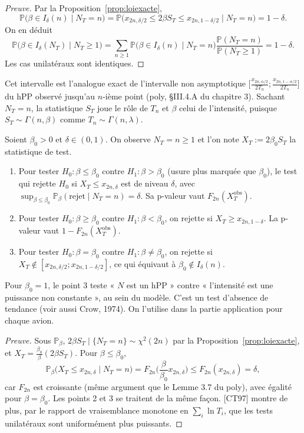 \begin{proof}[Preuve]
Par la Proposition~\ref{prop:loiexacte},
\[
\mathbb{P}\big(\beta\in I_\delta(n)\mid N_T=n\big)=\mathbb{P}\big(x_{2n,\delta/2}\le2\beta S_T\le x_{2n,1-\delta/2}\mid N_T=n\big)=1-\delta.
\]
On en déduit
\[
\mathbb{P}\big(\beta\in I_\delta(N_T)\mid N_T\ge1\big)=\sum_{n\ge1}\mathbb{P}\big(\beta\in I_\delta(n)\mid N_T=n\big)\frac{\mathbb{P}(N_T=n)}{\mathbb{P}(N_T\ge1)}=1-\delta.
\]
Les cas unilatéraux sont identiques.
\end{proof}

\begin{remarque}
Cet intervalle est l'analogue exact de l'intervalle non asymptotique $\big[\frac{x_{2n,\alpha/2}}{2T_n};\frac{x_{2n,1-\alpha/2}}{2T_n}\big]$ du hPP observé jusqu'au $n$-ième point (poly, §III.4.A du chapitre 3). Sachant $N_T=n$, la statistique $S_T$ joue le rôle de $T_n$ et $\beta$ celui de l'intensité, puisque $S_T\sim\Gamma(n,\beta)$ comme $T_n\sim\Gamma(n,\lambda)$.
\end{remarque}

\begin{proposition}\label{prop:testbeta}
Soient $\beta_0>0$ et $\delta\in(0,1)$. On observe $N_T=n\ge1$ et l'on note $X_T:=2\beta_0S_T$ la statistique de test.
\begin{enumerate}
\item Pour tester $H_0:\beta\le\beta_0$ contre $H_1:\beta>\beta_0$ (usure plus marquée que $\beta_0$), le test qui rejette $H_0$ si $X_T\le x_{2n,\delta}$ est de niveau $\delta$, avec $\sup_{\beta\le\beta_0}\mathbb{P}_\beta(\text{rejet}\mid N_T=n)=\delta$. Sa p-valeur vaut $F_{2n}(X_T^{\mathrm{obs}})$.
\item Pour tester $H_0:\beta\ge\beta_0$ contre $H_1:\beta<\beta_0$, on rejette si $X_T\ge x_{2n,1-\delta}$. La p-valeur vaut $1-F_{2n}(X_T^{\mathrm{obs}})$.
\item Pour tester $H_0:\beta=\beta_0$ contre $H_1:\beta\neq\beta_0$, on rejette si $X_T\notin[x_{2n,\delta/2};x_{2n,1-\delta/2}]$, ce qui équivaut à $\beta_0\notin I_\delta(n)$.
\end{enumerate}
Pour $\beta_0=1$, le point 3 teste « $N$ est un hPP » contre « l'intensité est une puissance non constante », au sein du modèle. C'est un test d'absence de tendance (voir aussi Crow, 1974). On l'utilise dans la partie application pour chaque avion.
\end{proposition}

\begin{proof}[Preuve]
Sous $\mathbb{P}_\beta$, $2\beta S_T\mid\{N_T=n\}\sim\chi^2(2n)$ par la Proposition~\ref{prop:loiexacte}, et $X_T=\frac{\beta_0}{\beta}(2\beta S_T)$. Pour $\beta\le\beta_0$,
\[
\mathbb{P}_\beta\big(X_T\le x_{2n,\delta}\mid N_T=n\big)=F_{2n}\Big(\frac{\beta}{\beta_0}x_{2n,\delta}\Big)\le F_{2n}(x_{2n,\delta})=\delta,
\]
car $F_{2n}$ est croissante (même argument que le Lemme 3.7 du poly), avec égalité pour $\beta=\beta_0$. Les points 2 et 3 se traitent de la même façon. [CT97] montre de plus, par le rapport de vraisemblance monotone en $\sum_i\ln T_i$, que les tests unilatéraux sont uniformément plus puissants.
\end{proof}

